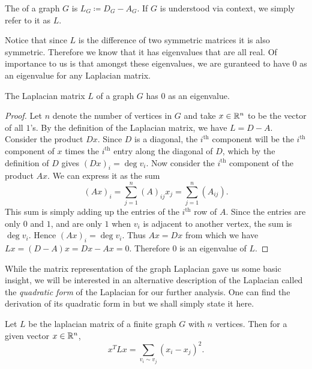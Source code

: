 \documentclass[11pt]{article}
\begin{document}
\begin{definition}
    The  of a graph $G$ is $L_G \coloneq D_G - A_G$. If $G$ is understood via context, we simply refer to it as $L$.
\end{definition}

Notice that since $L$ is the difference of two symmetric matrices it is also symmetric. Therefore we know that it has eigenvalues that are all real. Of importance to us is that amongst these eigenvalues, we are guranteed to have $0$ as an eigenvalue for any Laplacian matrix.

\begin{theorem}
    The Laplacian matrix $L$ of a graph $G$ has $0$ as an eigenvalue.
\end{theorem}

\begin{proof}
    Let $n$ denote the number of vertices in $G$ and take $x \in \mathbb{R}^n$ to be the vector of all $1$'s. By the definition of the Laplacian matrix, we have $L = D - A$. Consider the product $D x$. Since $D$ is a diagonal, the $i^\text{th}$ component will be the $i^\text{th}$ component of $x$ times the $i^\text{th}$ entry along the diagonal of $D$, which by the definition of $D$ gives $(Dx)_i = \deg v_i$. Now consider the $i^\text{th}$ component of the product $Ax$. We can express it as the sum
    \[
        (Ax)_i = \sum_{j=1}^n (A)_{ij} x_j = \sum_{j=1}^n (A_{ij})
    .\]
    This sum is simply adding up the entries of the $i^\text{th}$ row of $A$. Since the entries are only $0$ and $1$, and are only $1$ when $v_i$ is adjacent to another vertex, the sum is $\deg v_i$. Hence $(Ax)_i = \deg v_i$. Thus $Ax = Dx$ from which we have $Lx = (D - A)x = Dx - Ax = 0$. Therefore $0$ is an eigenvalue of $L$.
\end{proof}

While the matrix representation of the graph Laplacian gave us some basic insight, we will be interested in an alternative description of the Laplacian called the \emph{quadratic form} of the Laplacian for our further analysis. One can find the derivation of its quadratic form in \cite{mohar2004graph} but we shall simply state it here.

\begin{theorem}
    Let $L$ be the laplacian matrix of a finite graph $G$ with $n$ vertices. Then for a given vector $x \in \mathbb{R}^n$,
    \[
        x^T L x = \sum_{v_i \sim v_j} (x_i - x_j)^2.
    \]
\end{theorem}
\end{document}
